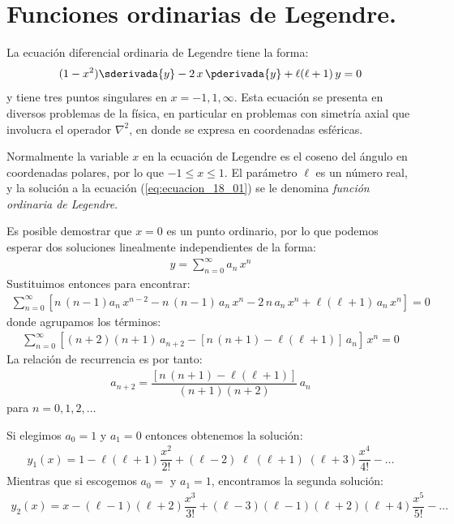 \section{Funciones ordinarias de Legendre.}

La ecuación diferencial ordinaria de Legendre tiene la forma:
\begin{align}
(1 - x^{2}) \sderivada{y} - 2 \, x \, \pderivada{y} + \ell (\ell + 1) \, y = 0
\label{eq:ecuacion_18_01}
\end{align}
y tiene tres puntos singulares en $x = -1, 1, \infty$. Esta ecuación se presenta en diversos problemas de la física, en particular en problemas con simetría axial que involucra el operador $\nabla^{2}$, en donde se expresa en coordenadas esféricas.
\par
Normalmente la variable $x$ en la ecuación de Legendre es el coseno del ángulo en coordenadas polares, por lo que $-1 \leq x \leq 1$. El parámetro $\ell$ es un número real, y la solución a la ecuación (\ref{eq:ecuacion_18_01}) se le denomina \emph{función ordinaria de Legendre}.
\par
Es posible demostrar que $x = 0$ es un punto ordinario, por lo que podemos esperar dos soluciones linealmente independientes de la forma:
\begin{align*}
y = \sum_{n=0}^{\infty} a_{n} \, x^{n}
\end{align*}
Sustituimos entonces para encontrar:
\begin{align*}
\sum_{n=0}^{\infty} \left[ n \, (n - 1) a_{n} \, x^{n-2} - n \, (n - 1) \, a_{n} \, x^{n} - 2 \, n \, a_{n} \, x^{n} + \ell (\ell + 1) \, a_{n} \, x^{n} \right] = 0
\end{align*}
donde agrupamos los términos:
\begin{align*}
\sum_{n=0}^{\infty} \left[ (n + 2)(n + 1) \, a_{n+2} - [ n \, (n+1) - \ell (\ell + 1) ] \, a_{n} \right] \, x^{n} = 0
\end{align*}
La relación de recurrencia es por tanto:
\begin{align}
a_{n+2} = \dfrac{[n \, (n + 1)- \ell (\ell + 1)]}{(n + 1)(n + 2)} \, a_{n}
\label{eq:ecuacion_18_02}
\end{align}
para $n = 0, 1, 2, \ldots$
\par
Si elegimos $a_{0} = 1$ y $a_{1} = 0$ entonces obtenemos la solución:
\begin{align}
y_{1}(x) = 1 - \ell (\ell + 1) \dfrac{x^{2}}{2!} + (\ell - 2)\; \ell \; (\ell + 1)\;(\ell + 3) \dfrac{x^{4}}{4!} - \ldots
\label{eq:ecuacion_18_03}
\end{align}
Mientras que si escogemos $a_{0} = $ y $ a_{1} = 1 $, encontramos la segunda solución:
\begin{align}
y_{2}(x) = x - (\ell - 1)(\ell + 2) \dfrac{x^{3}}{3!} + (\ell - 3) (\ell - 1)(\ell + 2)(\ell + 4) \dfrac{x^{5}}{5!} - \ldots
\label{eq:ecuacion_18_04}
\end{align}

